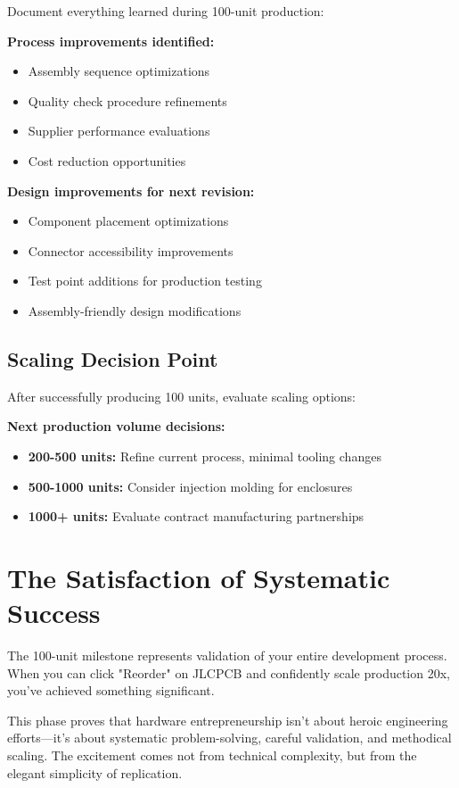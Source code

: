Document everything learned during 100-unit production:

\textbf{Process improvements identified:}
\begin{itemize}
\item Assembly sequence optimizations
\item Quality check procedure refinements
\item Supplier performance evaluations
\item Cost reduction opportunities
\end{itemize}

\textbf{Design improvements for next revision:}
\begin{itemize}
\item Component placement optimizations
\item Connector accessibility improvements
\item Test point additions for production testing
\item Assembly-friendly design modifications
\end{itemize}

\subsection{Scaling Decision Point}

After successfully producing 100 units, evaluate scaling options:

\textbf{Next production volume decisions:}
\begin{itemize}
\item \textbf{200-500 units:} Refine current process, minimal tooling changes
\item \textbf{500-1000 units:} Consider injection molding for enclosures
\item \textbf{1000+ units:} Evaluate contract manufacturing partnerships
\end{itemize}

\section{The Satisfaction of Systematic Success}

The 100-unit milestone represents validation of your entire development process. When you can click "Reorder" on JLCPCB and confidently scale production 20x, you've achieved something significant.

This phase proves that hardware entrepreneurship isn't about heroic engineering efforts—it's about systematic problem-solving, careful validation, and methodical scaling. The excitement comes not from technical complexity, but from the elegant simplicity of replication.

